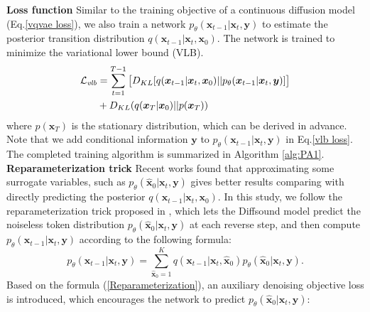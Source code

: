 \documentclass[lettersize,journal]{IEEEtran}
\begin{document}
\textbf{Loss function}
Similar to the training objective of a continuous diffusion model (Eq.\ref{vqvae loss}), we also train a network $p_{\theta}(\boldsymbol{x}_{t-1}|\boldsymbol{x}_{t},\boldsymbol{y})$ to estimate the posterior transition distribution $q(\boldsymbol{x}_{t-1}|\boldsymbol{x}_t,\boldsymbol{x}_0)$. The network is trained to minimize the variational lower bound (VLB).
\begin{equation}\label{vlb loss}
\begin{aligned}
    \mathcal{L}_{\mathit{vlb}} &= \sum_{t=1}^{T-1}  \big{[}D_{KL}[q(\boldsymbol{x}_{t-1}|\boldsymbol{x}_t,\boldsymbol{x}_0)||p_{\theta}(\boldsymbol{x}_{t-1}|\boldsymbol{x}_t,\boldsymbol{y})] \big{]} \\
    &+ D_{KL}(q(\boldsymbol{x}_T|\boldsymbol{x}_0)||p(\boldsymbol{x}_T))  
\end{aligned}
\end{equation}
where $p(\boldsymbol{x}_T)$ is the stationary distribution, which can be derived in advance. 
Note that we add conditional information $\boldsymbol{y}$ to $p_\theta(\boldsymbol{x}_{t-1} | \boldsymbol{x}_t, \boldsymbol{y})$ in Eq.\ref{vlb loss}. 
The completed training algorithm is summarized in Algorithm \ref{alg:PA1}.\\
\textbf{Reparameterization trick} Recent works \cite{gu2021vector,nichol2021improved} found that approximating some surrogate variables, {\color{black}such as $p_{\theta}(\hat{\boldsymbol{x}}_0|\boldsymbol{x}_t,\boldsymbol{y})$ gives better results comparing with directly predicting the posterior $q(\boldsymbol{x}_{t-1}|\boldsymbol{x}_t,\boldsymbol{x}_0)$.} In this study, we follow the reparameterization trick proposed in \cite{gu2021vector}, which lets the Diffsound model predict the noiseless token distribution $p_{\theta}(\hat{\boldsymbol{x}}_0|\boldsymbol{x}_t,\boldsymbol{y})$ at each reverse step, and then compute $p_{\theta}(\boldsymbol{x}_{t-1}|\boldsymbol{x}_t,\boldsymbol{y})$ according to the following formula:
\begin{equation}\label{Reparameterization}
	p_{\theta}(\boldsymbol{x}_{t-1}|\boldsymbol{x}_t,\boldsymbol{y})=\sum_{\hat{\boldsymbol{x}}_0=1}^{K} q(\boldsymbol{x}_{t-1}|\boldsymbol{x}_t,\hat{\boldsymbol{x}}_0) p_{\theta}(\hat{\boldsymbol{x}}_0|\boldsymbol{x}_t,\boldsymbol{y}).
\end{equation}
Based on the formula (\ref{Reparameterization}), an auxiliary denoising objective loss is introduced, which encourages the network to predict $p_{\theta}(\hat{\boldsymbol{x}}_0|\boldsymbol{x}_t,\boldsymbol{y})$:
\end{document}
